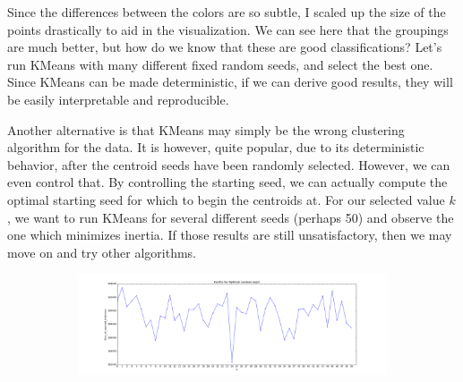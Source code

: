 \documentclass[20pt]{article} %
\begin{document}
Since the differences between the colors are so subtle, I scaled up the size of the points drastically to aid in the visualization.  We can see here that the groupings are much better, but how do we know that these are good classifications?  Let's run KMeans with many different fixed random seeds, and select the best one. Since KMeans can be made deterministic, if we can derive good results, they will be easily interpretable and reproducible.  

Another alternative is that KMeans may simply be the wrong clustering algorithm for the data.  It is however, quite popular, due to its deterministic behavior, after the centroid seeds have been randomly selected.  However, we can even control that.  By controlling the starting seed, we can actually compute the optimal starting seed for which to begin the centroids at.  For our selected value $k$, we want to run KMeans for several different seeds (perhaps 50) and observe the one which minimizes inertia.  If those results are still unsatisfactory, then we may move on and try other algorithms.  
\begin{figure}[!htbp]
  	\centering
   	\begin{subfigure}[p]{0.95\linewidth}
    	\includegraphics[width=\linewidth]{./figures/best_newseed.png}
   	\end{subfigure}
\end{figure}
\end{document}
